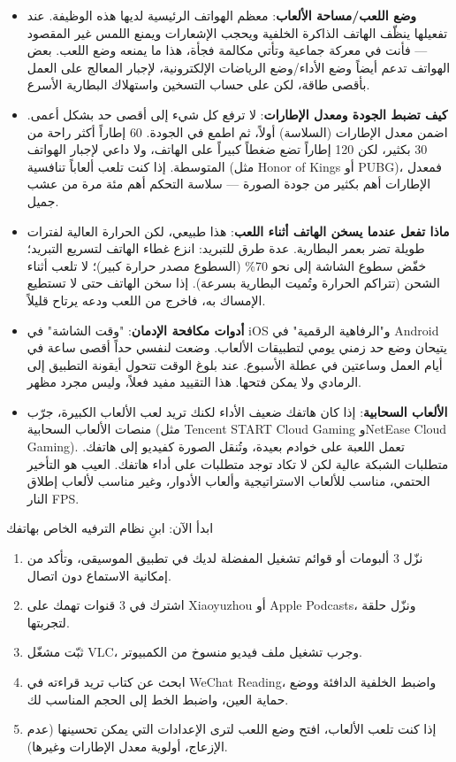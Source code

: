 \begin{itemize}
  \item \textbf{وضع اللعب/مساحة الألعاب}: معظم الهواتف الرئيسية لديها هذه الوظيفة. عند تفعيلها ينظّف الهاتف الذاكرة الخلفية ويحجب الإشعارات ويمنع اللمس غير المقصود — فأنت في معركة جماعية وتأتي مكالمة فجأة، هذا ما يمنعه وضع اللعب. بعض الهواتف تدعم أيضاً وضع الأداء/وضع الرياضات الإلكترونية، لإجبار المعالج على العمل بأقصى طاقة، لكن على حساب التسخين واستهلاك البطارية الأسرع.
  \item \textbf{كيف تضبط الجودة ومعدل الإطارات}: لا ترفع كل شيء إلى أقصى حد بشكل أعمى. اضمن معدل الإطارات (السلاسة) أولاً، ثم اطمع في الجودة. 60 إطاراً أكثر راحة من 30 بكثير، لكن 120 إطاراً تضع ضغطاً كبيراً على الهاتف، ولا داعي لإجبار الهواتف المتوسطة. إذا كنت تلعب ألعاباً تنافسية (مثل Honor of Kings أو PUBG)، فمعدل الإطارات أهم بكثير من جودة الصورة — سلاسة التحكم أهم مئة مرة من عشب جميل.
  \item \textbf{ماذا تفعل عندما يسخن الهاتف أثناء اللعب}: هذا طبيعي، لكن الحرارة العالية لفترات طويلة تضر بعمر البطارية. عدة طرق للتبريد: انزع غطاء الهاتف لتسريع التبريد؛ خفّض سطوع الشاشة إلى نحو 70\% (السطوع مصدر حرارة كبير)؛ لا تلعب أثناء الشحن (تتراكم الحرارة وتُميت البطارية بسرعة). إذا سخن الهاتف حتى لا تستطيع الإمساك به، فاخرج من اللعب ودعه يرتاح قليلاً.
  \item \textbf{أدوات مكافحة الإدمان}: "وقت الشاشة" في iOS و"الرفاهية الرقمية" في Android يتيحان وضع حد زمني يومي لتطبيقات الألعاب. وضعت لنفسي حداً أقصى ساعة في أيام العمل وساعتين في عطلة الأسبوع. عند بلوغ الوقت تتحول أيقونة التطبيق إلى الرمادي ولا يمكن فتحها. هذا التقييد مفيد فعلاً، وليس مجرد مظهر.
  \item \textbf{الألعاب السحابية}: إذا كان هاتفك ضعيف الأداء لكنك تريد لعب الألعاب الكبيرة، جرّب منصات الألعاب السحابية (مثل Tencent START Cloud Gaming وNetEase Cloud Gaming). تعمل اللعبة على خوادم بعيدة، وتُنقل الصورة كفيديو إلى هاتفك. متطلبات الشبكة عالية لكن لا تكاد توجد متطلبات على أداء هاتفك. العيب هو التأخير الحتمي، مناسب للألعاب الاستراتيجية وألعاب الأدوار، وغير مناسب لألعاب إطلاق النار FPS.
\end{itemize}

\begin{tcbpractice}{ابدأ الآن: ابنِ نظام الترفيه الخاص بهاتفك}
\begin{enumerate}
  \item نزّل 3 ألبومات أو قوائم تشغيل المفضلة لديك في تطبيق الموسيقى، وتأكد من إمكانية الاستماع دون اتصال.
  \item اشترك في 3 قنوات تهمك على Xiaoyuzhou أو Apple Podcasts، ونزّل حلقة لتجربتها.
  \item ثبّت مشغّل VLC، وجرب تشغيل ملف فيديو منسوخ من الكمبيوتر.
  \item ابحث عن كتاب تريد قراءته في WeChat Reading، واضبط الخلفية الدافئة ووضع حماية العين، واضبط الخط إلى الحجم المناسب لك.
  \item إذا كنت تلعب الألعاب، افتح وضع اللعب لترى الإعدادات التي يمكن تحسينها (عدم الإزعاج، أولوية معدل الإطارات وغيرها).
\end{enumerate}

\end{tcbpractice}
